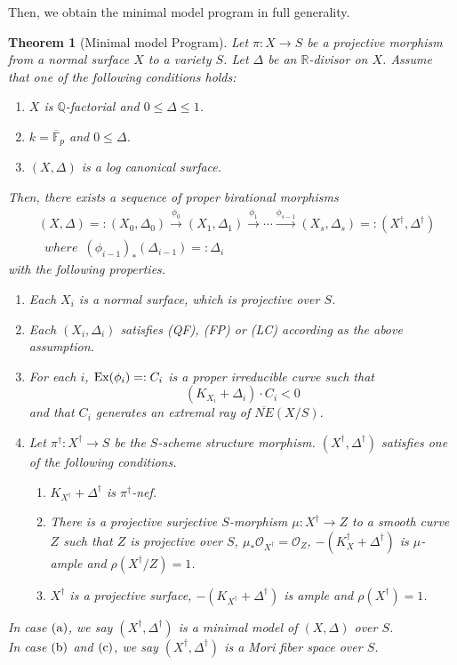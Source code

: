 \documentclass[12pt,twoside]{amsart}
\newtheorem{thm}{Theorem}[section]
\theoremstyle{definition}
\newcommand{\Q}{$\mathbb{Q}$}
\begin{document}
Then, we obtain the minimal model program in full generality. 

\begin{thm}[Minimal model Program]\label{relmmp}
Let $\pi:X\to S$ be a projective morphism 
from a normal surface $X$ to a variety $S$. 
Let $\Delta$ be an $\mathbb{R}$-divisor on $X$. 
Assume that one of the following conditions holds{\em{:}}
\begin{enumerate}
\item[(QF)]{$X$ is \Q-factorial and $0\leq \Delta\leq 1$.}
\item[(FP)]{$k=\overline{\mathbb{F}}_p$ and $0\leq\Delta$.}
\item[(LC)]{$(X, \Delta)$ is a log canonical surface.}
\end{enumerate}
Then, there exists a sequence of proper birational morphisms 
\begin{eqnarray*}
&(X, \Delta)=:(X_0, \Delta_0) \overset{\phi_0}\to 
(X_1, \Delta_1) \overset{\phi_1}\to \cdots 
\overset{\phi_{s-1}}\to (X_s, \Delta_s)=:(X^{\dagger}, \Delta^{\dagger})\\
&\,\,\,where\,\,\,(\phi_{i-1})_*(\Delta_{i-1})=:\Delta_i
\end{eqnarray*}
with the following properties. 
\begin{enumerate}
\item{Each $X_i$ is a normal surface, which is projective over $S$.}
\item{Each $(X_i, \Delta_i)$ satisfies {\em (QF)}, {\em (FP)} 
or {\em (LC)} according as the above assumption.}
\item{For each $i$, ${\rm Ex}(\phi_i)=:C_i$ is a proper irreducible curve such that 
$$(K_{X_i}+\Delta_i)\cdot C_i<0$$
and that $C_i$ generates an extremal ray of $\overline{NE}(X/S)$.}
\item{Let $\pi^{\dagger}:X^{\dagger}\to S$ be the $S$-scheme structure morphism. 
$(X^{\dagger}, \Delta^{\dagger})$ satisfies one of the following conditions.
\begin{enumerate}
\item{$K_{X^{\dagger}}+\Delta^{\dagger}$ is $\pi^{\dagger}$-nef.}
\item{There is a projective surjective $S$-morphism $\mu:X^{\dagger} \to Z$ to 
a smooth curve $Z$ such that $Z$ is projective over $S$, 
$\mu_*\mathcal O_{X^{\dagger}}=\mathcal O_Z$, 
$-(K_X^{\dagger}+\Delta^{\dagger})$ is $\mu$-ample and $\rho(X^{\dagger}/Z)=1$.}
\item{$X^{\dagger}$ is a projective surface, 
$-(K_{X^{\dagger}}+\Delta^{\dagger})$ is ample and 
$\rho(X^{\dagger})=1$.}
\end{enumerate}}
\end{enumerate}
In case $({\rm a})$, we say $(X^{\dagger}, \Delta^{\dagger})$ is a minimal model of $(X, \Delta)$ over $S$.\\
In case $({\rm b})$ and $({\rm c})$, we say $(X^{\dagger}, \Delta^{\dagger})$ is a Mori fiber space over $S$. 
\end{thm}
\end{document}
